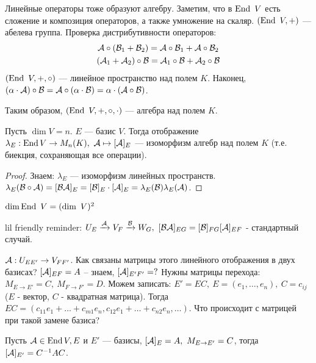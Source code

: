 \documentclass[main]{subfiles}
\begin{document}
Линейные операторы тоже образуют алгебру. Заметим, что в $\operatorname{End} \ V$ есть сложение и композиция операторов, а также умножение на скаляр.
$(\operatorname{End} \ V, +)$ — абелева группа. Проверка дистрибутивности операторов:
\begin{gather*}
    \mathcal{A}\circ(\mathcal{B}_1+\mathcal{B}_2) = \mathcal{A}\circ\mathcal{B}_1 + \mathcal{A}\circ\mathcal{B}_2 \\
    (\mathcal{A}_1 + \mathcal{A}_2)\circ\mathcal{B} = \mathcal{A}_1\circ\mathcal{B}+\mathcal{A}_2\circ\mathcal{B}
\end{gather*}
$(\operatorname{End} \ V, +, \circ)$ — линейное пространство над полем $K$. Наконец,
$(\alpha\cdot\mathcal{A})\circ\mathcal{B}=\mathcal{A}\circ(\alpha\cdot\mathcal{B})=\alpha\cdot(\mathcal{A}\circ\mathcal{B})$.

Таким образом, $(\operatorname{End} \ V, +, \circ, \cdot)$ — алгебра над полем $K$.




\begin{proposition}
    Пусть $\dim V = n$. $E$ — базис $V$.
    Тогда отображение $\lambda_E : \operatorname{End} V \rightarrow M_n(K), \ \mathcal{A} \mapsto [\mathcal{A}]_E$ — изоморфизм алгебр над полем $K$ (т.е. биекция, сохраняющая все операции).
\end{proposition}

\begin{proof}
    Знаем: $\lambda_E$ — изоморфизм линейных пространств. $\lambda_E(\mathcal{B}\circ\mathcal{A})=[\mathcal{B}\mathcal{A}]_E=[\mathcal{B}]_E\cdot[\mathcal{A}]_E = \lambda_E(\mathcal{B})\lambda_E(\mathcal{A})$.
\end{proof}

\begin{corollary}
    $\dim \operatorname{End}\ V = (\dim \ V)^2 $
\end{corollary}

lil friendly reminder: $U_E \xrightarrow{\mathcal{A}} V_F \xrightarrow{\mathcal{B}} W_G,\
    [\mathcal{B}\mathcal{A}]_{EG} = [\mathcal{B}]_{FG}[\mathcal{A}]_{EF}
$ - стандартный случай.

$\mathcal{A}: U_{EE'} \rightarrow V_{FF'}$. Как связаны матрицы этого линейного отображения в двух базисах?
$[\mathcal{A}]_{EF}=A$ -- знаем,  $[\mathcal{A}]_{E'F'}=?$ Нужны матрицы перехода:
$M_{E\rightarrow E'} = C,\ M_{F\rightarrow F'} = D$. Можем записать:
$E' = EC,\ E=(e_1, \ldots ,e_n),\ C=c_{ij}$ ($E$ - вектор, $C$ - квадратная матрица). Тогда
$EC=(c_{11}e_1+\ldots+c_{m1}e_n, c_{12}e_1 +\ldots +c_{n2}e_n, \ldots)$. Что происходит с матрицей при такой замене базиса?

\begin{proposition}
    Пусть $\mathcal{A} \in \operatorname{End} V, E$ и $E'$ — базисы, $[\mathcal{A}]_{E}=A,\ M_{E\rightarrow E'}=C$, тогда $[\mathcal{A}]_{E'}=C^{-1}AC$.
\end{proposition}
\end{document}
